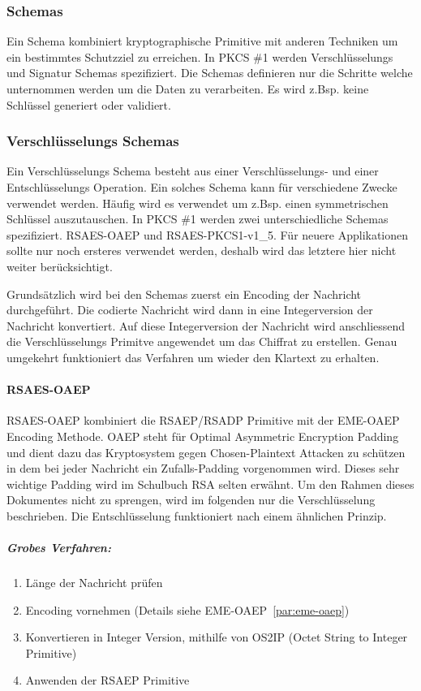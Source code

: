 \documentclass[10pt,a4paper]{article}
\begin{document}
\subsubsection{Schemas}
Ein Schema kombiniert kryptographische Primitive mit anderen Techniken um ein bestimmtes
Schutzziel zu erreichen. In PKCS \#1 werden Verschlüsselungs und Signatur Schemas
spezifiziert. Die Schemas definieren nur die Schritte welche unternommen werden um die
Daten zu verarbeiten. Es wird z.Bsp. keine Schlüssel generiert oder validiert.

\subsubsection{Verschlüsselungs Schemas}
Ein Verschlüsselungs Schema besteht aus einer Verschlüsselungs- und einer Entschlüsselungs
Operation. Ein solches Schema kann für verschiedene Zwecke verwendet werden. Häufig wird
es verwendet um z.Bsp. einen symmetrischen Schlüssel auszutauschen. In PKCS \#1 werden
zwei unterschiedliche Schemas spezifiziert. RSAES-OAEP und RSAES-PKCS1-v1\_5. Für neuere
Applikationen sollte nur noch ersteres verwendet werden, deshalb wird das letztere hier
nicht weiter berücksichtigt.

Grundsätzlich wird bei den Schemas zuerst ein Encoding der Nachricht durchgeführt. Die
codierte Nachricht wird dann in eine Integerversion der Nachricht konvertiert. Auf diese
Integerversion der Nachricht wird anschliessend die Verschlüsselungs Primitve angewendet
um das Chiffrat zu erstellen. Genau umgekehrt funktioniert das Verfahren um wieder den
Klartext zu erhalten.

\paragraph{RSAES-OAEP}
RSAES-OAEP kombiniert die RSAEP/RSADP Primitive mit der EME-OAEP Encoding Methode. OAEP
steht für Optimal Asymmetric Encryption Padding und dient dazu das Kryptosystem gegen
Chosen-Plaintext Attacken zu schützen in dem bei jeder Nachricht ein Zufalls-Padding
vorgenommen wird. Dieses sehr wichtige Padding wird im Schulbuch RSA selten erwähnt.
Um den Rahmen dieses Dokumentes nicht zu sprengen, wird im folgenden nur die
Verschlüsselung beschrieben. Die Entschlüsselung funktioniert nach einem ähnlichen
Prinzip.

\subparagraph{Grobes Verfahren:}
\begin{enumerate}
    \item Länge der Nachricht prüfen
    \item Encoding vornehmen (Details siehe EME-OAEP~\ref{par:eme-oaep})
    \item Konvertieren in Integer Version, mithilfe von OS2IP (Octet String to Integer
        Primitive)
    \item Anwenden der RSAEP Primitive
\end{enumerate}
\end{document}
